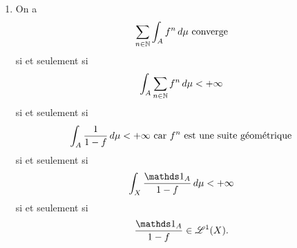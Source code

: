 {\begin{td-sol}[]
\begin{enumerate}
\begin{itemize}
\begin{itemize}
                    \item Si \(\mu(C)>0\), alors on a
                    \begin{equation*}
                        \int_{C}f^n\der\mu = \int_{X}\one_C f^n\der\mu.
                    \end{equation*}
                    On pose alors \(g_n(x)=f^n(x)\one_C(x)\) une suite croissante de
                    fonctions mesurables car \(C\) est l'image réciproque par \(f\),
                    qui est mesurable. On peut alors appliquer le théorème de convergence
                    monotone pour obtenir
                    \begin{equation*}
                        \lim_{n\to+\infty}\int_{C}f^n\der\mu = \int_{C}\limsup_{n\to+\infty}f^n\der\mu
                    \end{equation*}
                    Comme le contenu de l'intégrale vaut \(+\infty\times\one_C\), on a l'intégrale qui vaut \(+\infty\).
                \end{itemize}
                En résumé, on a 
                \begin{equation*}
                    (1) + (2) =
                    \begin{cases}
                        \mu(B) & \text{si } \mu(C)=0 \\
                        +\infty & \text{si } \mu(C)>0
                    \end{cases}
                \end{equation*}
            \end{itemize}

            \item On a
            \begin{equation*}
                \sum_{n\in\mathbb{N}}\int_{A}f^n\mathop{}\!{d}\mu \text{ converge}
            \end{equation*}
            si et seulement si
            \begin{equation*}
                \int_{A}\sum_{n\in\mathbb{N}}f^n\mathop{}\!{d}\mu < +\infty
            \end{equation*}
            si et seulement si
            \begin{equation*}
                \int_{A}\frac{1}{1-f}\mathop{}\!{d}\mu < +\infty \text{ car } f^n \text{ est une suite géométrique}
            \end{equation*}
            si et seulement si
            \begin{equation*}
                \int_{X}\frac{\one_A}{1-f}\der\mu < +\infty
            \end{equation*}
            si et seulement si
            \begin{equation*}
                \frac{\one_A}{1-f}\in\scr L^1(X).
            \end{equation*}


\end{enumerate}
\end{td-sol}}
